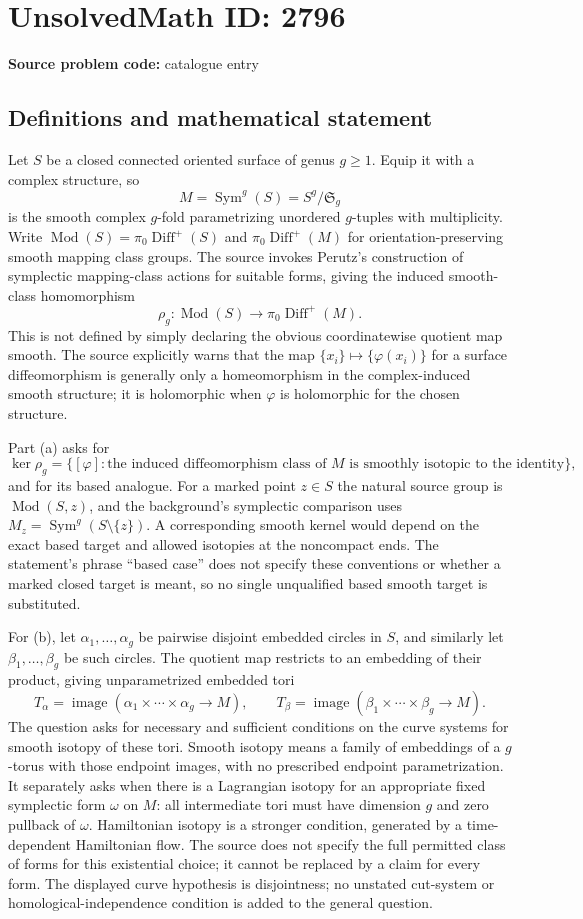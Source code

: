 \documentclass[11pt]{article}
\begin{document}
\section*{UnsolvedMath ID: 2796}
\textbf{Source problem code:} catalogue entry
\subsection{Definitions and mathematical statement}
Let $S$ be a closed connected oriented surface of genus $g\ge1$. Equip it with a complex structure, so
\[
 M=\operatorname{Sym}^g(S)=S^g/\mathfrak S_g
\]
is the smooth complex $g$-fold parametrizing unordered $g$-tuples with multiplicity. Write $\operatorname{Mod}(S)=\pi_0\operatorname{Diff}^+(S)$ and $\pi_0\operatorname{Diff}^+(M)$ for orientation-preserving smooth mapping class groups. The source invokes Perutz's construction of symplectic mapping-class actions for suitable forms, giving the induced smooth-class homomorphism
\[
 \rho_g:\operatorname{Mod}(S)\longrightarrow\pi_0\operatorname{Diff}^+(M).
\]
This is not defined by simply declaring the obvious coordinatewise quotient map smooth. The source explicitly warns that the map $\{x_i\}\mapsto\{\varphi(x_i)\}$ for a surface diffeomorphism is generally only a homeomorphism in the complex-induced smooth structure; it is holomorphic when $\varphi$ is holomorphic for the chosen structure.

Part (a) asks for
\[
 \ker\rho_g=\{[\varphi]:\text{the induced diffeomorphism class of $M$ is smoothly isotopic to the identity}\},
\]
and for its based analogue. For a marked point $z\in S$ the natural source group is $\operatorname{Mod}(S,z)$, and the background's symplectic comparison uses $M_z=\operatorname{Sym}^g(S\setminus\{z\})$. A corresponding smooth kernel would depend on the exact based target and allowed isotopies at the noncompact ends. The statement's phrase ``based case'' does not specify these conventions or whether a marked closed target is meant, so no single unqualified based smooth target is substituted.

For (b), let $\alpha_1,\ldots,\alpha_g$ be pairwise disjoint embedded circles in $S$, and similarly let $\beta_1,\ldots,\beta_g$ be such circles. The quotient map restricts to an embedding of their product, giving unparametrized embedded tori
\[
 T_\alpha=\operatorname{image}(\alpha_1\times\cdots\times\alpha_g\to M),\qquad
 T_\beta=\operatorname{image}(\beta_1\times\cdots\times\beta_g\to M).
\]
The question asks for necessary and sufficient conditions on the curve systems for smooth isotopy of these tori. Smooth isotopy means a family of embeddings of a $g$-torus with those endpoint images, with no prescribed endpoint parametrization. It separately asks when there is a Lagrangian isotopy for an appropriate fixed symplectic form $\omega$ on $M$: all intermediate tori must have dimension $g$ and zero pullback of $\omega$. Hamiltonian isotopy is a stronger condition, generated by a time-dependent Hamiltonian flow. The source does not specify the full permitted class of forms for this existential choice; it cannot be replaced by a claim for every form. The displayed curve hypothesis is disjointness; no unstated cut-system or homological-independence condition is added to the general question.
\end{document}

